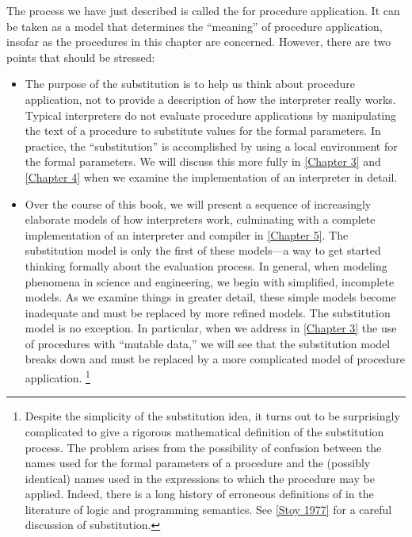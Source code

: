The process we have just described is called the  for procedure application.
It can be taken as a model that determines the “meaning” of procedure application, insofar as the procedures in this chapter are concerned.
However, there are two points that should be stressed:
\begin{itemize}

	\item
		The purpose of the substitution is to help us think about procedure application, not to provide a description of how the interpreter really works.
		Typical interpreters do not evaluate procedure applications by manipulating the
		text of a procedure to substitute values for the formal parameters.
		In practice, the “substitution” is accomplished by using a local environment for the formal parameters.
		We will discuss this more fully in \cref{Chapter 3} and \cref{Chapter 4} when we examine the implementation of an interpreter in detail.

	\item
		Over the course of this book, we will present a sequence of increasingly elaborate models of how interpreters work, culminating with a complete implementation of an interpreter and compiler in \cref{Chapter 5}.
		The substitution model is only the first of these models---a way to get started thinking formally about the evaluation process.
		In general, when modeling phenomena in science and engineering, we begin with simplified, incomplete models.
		As we examine things in greater detail, these simple models become inadequate and must be replaced by more refined models.
		The substitution model is no exception.
		In particular, when we address in \cref{Chapter 3} the use of procedures with “mutable data,” we will see that the substitution model breaks down and must be replaced by a more complicated model of procedure application.%
		\footnote{
			Despite the simplicity of the substitution idea, it turns out to be surprisingly complicated to give a rigorous mathematical definition of the substitution process.
			The problem arises from the possibility of confusion between the names used for the formal parameters of a procedure and the (possibly identical) names used in the expressions to which the procedure may be applied.
			Indeed, there is a long history of erroneous definitions of  in the literature of logic and programming semantics.
			See \cref{Stoy 1977} for a careful discussion of substitution.
		}

\end{itemize}



